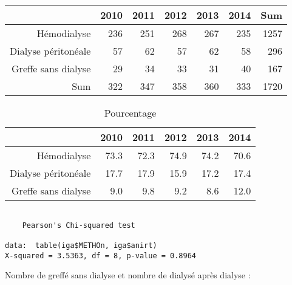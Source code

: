 \documentclass[11pt,a4paper]{article}\usepackage[]{graphicx}\usepackage[]{color}
\makeatletter
\newenvironment{kframe}{%
 \def\at@end@of@kframe{}%
 \ifinner\ifhmode%
  \def\at@end@of@kframe{\end{minipage}}%
  \begin{minipage}{\columnwidth}%
 \fi\fi%
 \def\FrameCommand##1{\hskip\@totalleftmargin \hskip-\fboxsep
 \colorbox{shadecolor}{##1}\hskip-\fboxsep
     \hskip-\linewidth \hskip-\@totalleftmargin \hskip\columnwidth}%
 \MakeFramed {\advance\hsize-\width
   \@totalleftmargin\z@ \linewidth\hsize
   \@setminipage}}%
 {\par\unskip\endMakeFramed%
 \at@end@of@kframe}
\newenvironment{knitrout}{}{} %
\makeatother
\begin{document}
\begin{table}[ht]
\centering
\begin{tabular}{rrrrrrr}
  \hline
 & 2010 & 2011 & 2012 & 2013 & 2014 & Sum \\ 
  \hline
Hémodialyse & 236 & 251 & 268 & 267 & 235 & 1257 \\ 
  Dialyse péritonéale & 57 & 62 & 57 & 62 & 58 & 296 \\ 
  Greffe sans dialyse & 29 & 34 & 33 & 31 & 40 & 167 \\ 
  Sum & 322 & 347 & 358 & 360 & 333 & 1720 \\ 
   \hline
\end{tabular}
\end{table}
\begin{table}[ht]
\centering
\begin{tabular}{rrrrrr}
  \hline
 & 2010 & 2011 & 2012 & 2013 & 2014 \\ 
  \hline
Hémodialyse & 73.3 & 72.3 & 74.9 & 74.2 & 70.6 \\ 
  Dialyse péritonéale & 17.7 & 17.9 & 15.9 & 17.2 & 17.4 \\ 
  Greffe sans dialyse & 9.0 & 9.8 & 9.2 & 8.6 & 12.0 \\ 
   \hline
\end{tabular}
\caption{Pourcentage} 
\end{table}


\begin{knitrout}
\color{fgcolor}\begin{kframe}
\begin{verbatim}

	Pearson's Chi-squared test

data:  table(iga$METHOn, iga$anirt)
X-squared = 3.5363, df = 8, p-value = 0.8964
\end{verbatim}
\end{kframe}
\end{knitrout}

Nombre de greffé sans dialyse et nombre de dialysé après dialyse :
\end{document}
